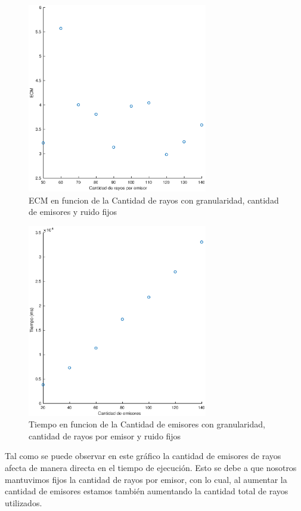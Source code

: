 \begin{figure}[H]
	\centering	\includegraphics[width=0.7\textwidth]{img/cantrayos_ecm}
	\caption{ECM en funcion de la Cantidad de rayos con granularidad, cantidad de emisores y ruido fijos}
	\label{fig:cantrayos_eps}
\end{figure}


\begin{figure}[H]
	\centering	\includegraphics[width=0.7\textwidth]{img/emi_tiempo}
	\caption{Tiempo en funcion de la Cantidad de emisores con granularidad, cantidad de rayos por emisor y ruido fijos}
	\label{fig:emi_tiempo}
\end{figure}
\par Tal como se puede observar en este gr\'afico la cantidad de emisores de rayos afecta de manera directa en el tiempo de ejecuci\'on. Esto se debe a que nosotros mantuvimos fijos la cantidad de rayos por emisor, con lo cual, al aumentar
la cantidad de emisores estamos tambi\'en aumentando la cantidad total de rayos utilizados.

